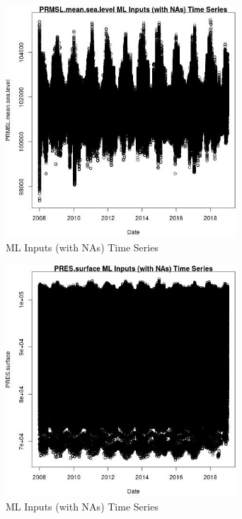\begin{figure} 
\centering  
\includegraphics[width=0.77\textwidth]{Code_Outputs/Report_ML_input_PM25_Step4_part_f_de_duplicated_aves_prioritize_24hr_obswNAs_PRMSLmeansealevelvDate.jpg} 
\caption{\label{fig:Report_ML_input_PM25_Step4_part_f_de_duplicated_aves_prioritize_24hr_obswNAsPRMSLmeansealevelvDate}ML Inputs (with NAs) Time Series} 
\end{figure} 
 

\begin{figure} 
\centering  
\includegraphics[width=0.77\textwidth]{Code_Outputs/Report_ML_input_PM25_Step4_part_f_de_duplicated_aves_prioritize_24hr_obswNAs_PRESsurfacevDate.jpg} 
\caption{\label{fig:Report_ML_input_PM25_Step4_part_f_de_duplicated_aves_prioritize_24hr_obswNAsPRESsurfacevDate}ML Inputs (with NAs) Time Series} 
\end{figure} 
 

